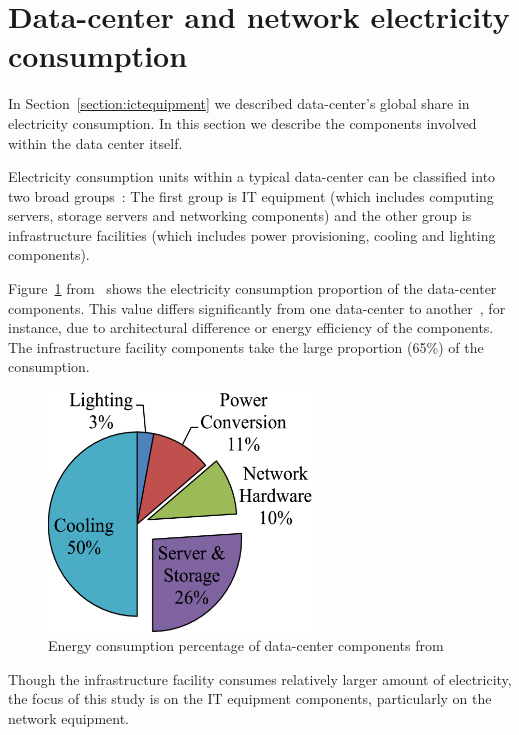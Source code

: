 \section {Data-center and network electricity consumption}
\label{section:datacenter} 
In Section~\ref{section:ictequipment} we described data-center's global share in electricity consumption. In this section we describe the components involved within the data center itself.

Electricity consumption units within a typical data-center can be classified into two broad groups~\cite{DBLP:journals/comsur/DayarathnaWF16}: The first group is IT equipment (which includes computing servers, storage servers and networking components) and the other group is infrastructure facilities (which includes power provisioning, cooling and lighting components).

Figure~\ref{fig:datacenterenergy} from~\cite{DBLP:journals/comsur/DayarathnaWF16} shows the electricity consumption proportion of the data-center components. This value differs significantly from one data-center to another~\cite{DBLP:series/synthesis/2013Barroso}, for instance, due to architectural difference\cite{DBLP:conf/eenergy/GyarmatiT10} or energy efficiency of the components. The infrastructure facility components take the large proportion (65\%) of the consumption. 
\begin{figure}[ht]
	\begin{center}
		\includegraphics[width=7cm]{images/datacenterenergy.pdf}
		\caption{Energy consumption percentage of data-center components from~\cite{DBLP:journals/comsur/DayarathnaWF16}}
		\label{fig:datacenterenergy}
	\end{center}
\end{figure}
Though the infrastructure facility consumes relatively larger amount of electricity, the focus of this study is on the IT equipment components, particularly on the network equipment. 

